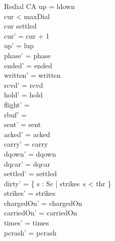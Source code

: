 \documentclass[a4paper,10pt,fleqn]{article}
\begin{document}
\begin{schema}{Redial}
  \Delta CA
\where
  up = ldown \\
  cur < maxDial \\
  cur \in settled \\
  cur' = cur + 1 \\
  up' = lup \\
  phase' = phase \\
  ended' = ended \\
  written' = written \\
  rcvd' = rcvd \\
  hold' = hold \\
  flight' = \emptyset \\
  rbuf' = \emptyset \\
  sent' = sent \\
  acked' = acked \\
  carry' = carry \\
  dqown' = dqown \\
  dqcar' = dqcar \\
  settled' = settled \\
  dirty' = \{ s : Sc | strikes~s < thr \} \\
  strikes' = strikes \\
  chargedOn' = chargedOn \\
  carriedOn' = carriedOn \\
  times' = times \\
  pcrash' = pcrash
\end{schema}
\end{document}
